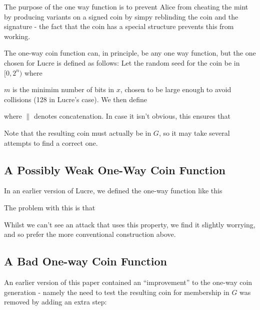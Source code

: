 \documentclass[a4paper,titlepage]{article}
\begin{document}
The purpose of the one way function is to prevent Alice from cheating
the mint by producing variants on a signed coin by simpy reblinding
the coin and the signature - the fact that the coin has a special
structure prevents this from working.

The one-way coin function can, in principle, be any one way function,
but the one chosen for Lucre is defined as follows: Let the random
seed for the coin be in $[0,2^n)$ where 


$m$ is the minimim number of bits in $x$, chosen to be large
enough to avoid collisions (128 in Lucre's case). We then define


where $\|$ denotes concatenation. In case it isn't obvious, this
ensures that


Note that the resulting coin must actually be in $G$, so it may take
several attempts to find a correct one.

\subsection{A Possibly Weak One-Way Coin Function}

In an earlier version of Lucre, we defined the one-way function like
this



The problem with this is that


Whilst we can't see an attack that uses this property, we find it
slightly worrying, and so prefer the more conventional construction above.

\subsection{A Bad One-way Coin Function}
\label{sec:badoneway}

An earlier version of this paper contained an ``improvement'' to the
one-way coin generation - namely the need to test the resulting coin
for membership in $G$ was removed by adding an extra step:

\end{document}
